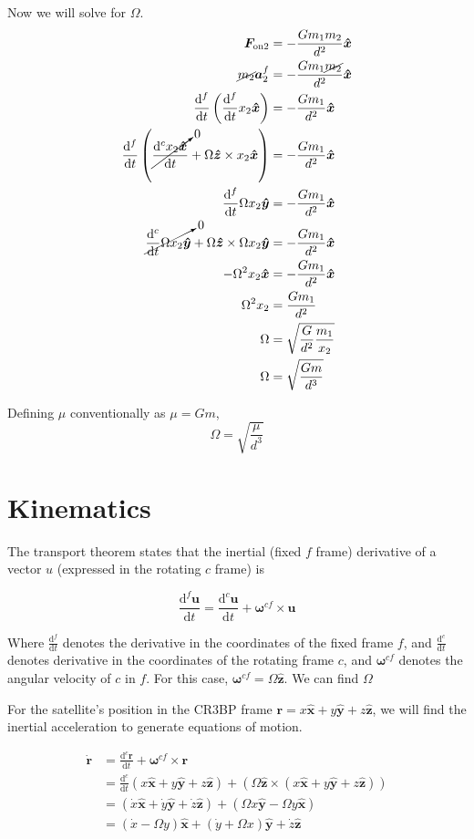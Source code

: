 \documentclass{article}
\newcommand{\dd}[2]{\frac{\mathrm{d}#1}{\mathrm{d}#2}}
\newcommand{\vv}[1]{\boldsymbol{#1}}
\newcommand{\vh}[1]{\boldsymbol{\hat{#1}}}
\begin{document}
Now we will solve for $\Omega$.
\[\begin{aligned}
    \vv{F_{\text{on2}}}&=-\frac{Gm_1m_2}{d^2}\vh{x}\\
    \cancel{m_2}\vv{a}_2^f&=-\frac{Gm_1\cancel{m_2}}{d^2}\vh{x}\\
    \dd{^f}{t}\left(\dd{^f}{t}x_2\vh{x}\right)&=-\frac{Gm_1}{d^2}\vh{x}\\
    \dd{^f}{t}\left(\cancelto{0}{\dd{^c x_2\vh{x}}{t}}+\Omega\vh{z}\times x_2\vh{x}\right)&=-\frac{Gm_1}{d^2}\vh{x}\\
    \dd{^f}{t}\Omega x_2\vh{y}&=-\frac{Gm_1}{d^2}\vh{x}\\
    \cancelto{0}{\dd{^c}{t}\Omega x_2 \vh{y}}+\Omega\vh{z}\times\Omega x_2\vh{y}&=-\frac{Gm_1}{d^2}\vh{x}\\
    -\Omega^2 x_2\vh{x}&=-\frac{Gm_1}{d^2}\vh{x}\\
    \Omega^2x_2&=\frac{Gm_1}{d^2}\\
    \Omega&=\sqrt{\frac{G}{d^2}\frac{m_1}{x_2}}\\
    \Omega&=\sqrt{\frac{Gm}{d^3}}\\
\end{aligned}\]

Defining $\mu$ conventionally as $\mu=Gm$,
\[\boxed{\Omega=\sqrt{\frac{\mu}{d^3}}}\]

\section*{Kinematics}
The transport theorem states that the inertial (fixed $f$ frame) derivative of a vector $u$ (expressed in the rotating $c$ frame) is

\[\dd{^f \vv{u}}{t}=\dd{^c\vv{u}}{t}+\vv{\omega}^{cf}\times\vv{u}\]

Where $\dd{^f}{t}$ denotes the derivative in the coordinates of the fixed frame $f$, and $\dd{^c}{t}$ denotes derivative in the coordinates of the rotating frame $c$, and $\vv{\omega}^{cf}$ denotes the angular velocity of $c$ in $f$. For this case, $\vv{\omega}^{cf}=\Omega\vh{z}$. We can find $\Omega$

For the satellite's position in the CR3BP frame $\vv{r}=x\vh{x}+y\vh{y}+z\vh{z}$, we will find the inertial acceleration to generate equations of motion.

\[
\begin{aligned}
    \vv{\dot{r}}&=\dd{^c\vv{r}}{t}+\vv{\omega}^{cf}\times\vv{r}\\
    &=\dd{^c}{t}\left(x\vh{x}+y\vh{y}+z\vh{z}\right)+\left(\Omega\vh{z}\times\left(x\vh{x}+y\vh{y}+z\vh{z}\right)\right)\\
    &=\left(\dot{x}\vh{x}+\dot{y}\vh{y}+\dot{z}\vh{z}\right)+\left(\Omega x\vh{y}-\Omega y\vh{x}\right)\\
    &=\left(\dot{x}-\Omega y\right)\vh{x}+\left(\dot{y}+\Omega x\right)\vh{y}+\dot{z}\vh{z}
\end{aligned}
\]
\end{document}
